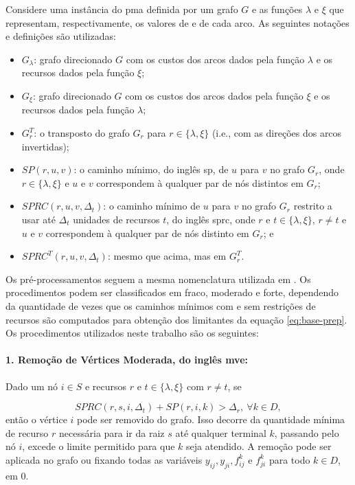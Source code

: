 Considere uma  instância do  \gls{pma} definida  por um grafo  $G$ e  as funções
$\lambda$ e  $\xi$ que  representam, respectivamente, os  valores de  {\delay} e
{\jitter} de cada arco. As seguintes notações e definições são utilizadas:

\begin{itemize}
 \item $G_{\lambda}$: grafo  direcionado $G$ com os custos dos  arcos dados pela
função $\lambda$ e os recursos dados pela função $\xi$;
 \item  $G_{\xi}$: grafo  direcionado $G$  com os  custos dos  arcos dados  pela
função $\xi$ e os recursos dados pela função $\lambda$;
 \item $G^T_r$: o transposto do grafo $G_r$ para $r \in \{\lambda, \xi\}$ (i.e.,
com as direções dos arcos invertidas);
 \item $SP(r, u, v)$:  o caminho mínimo, do inglês \gls{sp}, de  $u$ para $v$ no
grafo $G_r$, onde $r  \in \{\lambda, \xi\}$ e $u$ e  $v$ correspondem à qualquer
par de nós distintos em $G_r$;
 \item $SPRC(r,  u, v,  \Delta_t)$: o caminho  mínimo de $u$  para $v$  no grafo
$G_r$  restrito a  usar  até  $\Delta_t$ unidades  de  recursos  $t$, do  inglês
\gls{sprc}, onde $r \text{ e } t \in  \{\lambda, \xi\} \text{, } r \neq t$ e $u$
e $v$ correspondem à qualquer par de nós distinto em $G_r$; e
 \item $SPRC^T(r, u, v, \Delta_t)$: mesmo que acima, mas em $G^{T}_{r}$.
\end{itemize}

Os    pré-processamentos   seguem    a   mesma    nomenclatura   utilizada    em
\cite{tiago:2019}. Os procedimentos podem ser classificados em fraco, moderado e
forte,  dependendo da  quantidade de  vezes que  os caminhos  mínimos com  e sem
restrições de  recursos são computados  para obtenção dos limitantes  da equação
\eqref{eq:base-prep}.  Os   procedimentos  utilizados  neste  trabalho   são  os
seguintes:

\noindent \paragraph*{
1. Remoção  de Vértices Moderada, do  inglês \gls{mve}:} Dado um  nó $i
\in S$ e recursos $r$ e $t \in \{\lambda, \xi\}$ com $r \neq t$, se

\begin{equation}
  {SPRC}(r, s, i, \Delta_t) + {SP}(r, i, k) > \Delta_r, \ \forall k \in D,
\end{equation} então o  vértice $i$ pode ser removido do  grafo. Isso decorre da
quantidade mínima  de recurso $r$  necessária para ir  da raiz $s$  até qualquer
terminal $k$, passando pelo nó $i$, excede  o limite permitido para que $k$ seja
atendido. A  remoção pode ser  aplicada no grafo  ou fixando todas  as variáveis
$y_{ij}, y_{ji}, f_{ij}^{k}$ e $f_{ji}^k$ para todo $k \in D$, em $0$.

